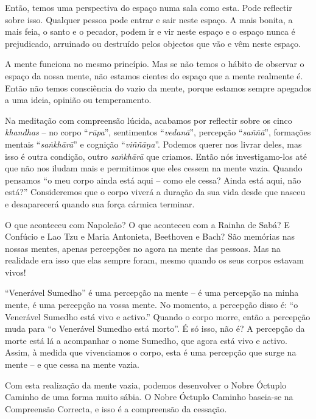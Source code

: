 Então, temos uma perspectiva do espaço numa sala como esta. Pode reflectir sobre
isso. Qualquer pessoa pode entrar e sair neste espaço. A mais bonita, a mais
feia, o santo e o pecador, podem ir e vir neste espaço e o espaço nunca é
prejudicado, arruinado ou destruído pelos objectos que vão e vêm neste espaço.

A mente funciona no mesmo princípio. Mas se não temos o hábito de observar o
espaço da nossa mente, não estamos cientes do espaço que a mente realmente é.
Então não temos consciência do vazio da mente, porque estamos sempre apegados a
uma ideia, opinião ou temperamento.

Na meditação com compreensão lúcida, acabamos por reflectir sobre os cinco
\emph{khandhas} -- no corpo ``\emph{rūpa}'', sentimentos ``\emph{vedanā}'',
percepção ``\emph{saññā}'', formações mentais ``\emph{saṅkhārā}'' e cognição
``\emph{viññāṇa}''. Podemos querer nos livrar deles, mas isso é outra condição,
outro \emph{saṅkhārā} que criamos. Então nós investigamo-los até que não nos
iludam mais e permitimos que eles cessem na mente vazia. Quando pensamos ``o meu
corpo ainda está aqui -- como ele cessa? Ainda está aqui, não está?''
Consideremos que o corpo viverá a duração da sua vida desde que nasceu e
desaparecerá quando sua força cármica terminar.

O que aconteceu com Napoleão? O que aconteceu com a Rainha de Sabá? E Confúcio e
Lao Tzu e Maria Antonieta, Beethoven e Bach? São memórias nas nossas mentes,
apenas percepções no agora na mente das pessoas. Mas na realidade era isso que
elas sempre foram, mesmo quando os seus corpos estavam vivos!

``Venerável Sumedho'' é uma percepção na mente -- é uma percepção na minha
mente, é uma percepção na vossa mente. No momento, a percepção disso é: ``o
Venerável Sumedho está vivo e activo.'' Quando o corpo morre, então a percepção
muda para ``o Venerável Sumedho está morto''. É só isso, não é? A percepção da
morte está lá a acompanhar o nome Sumedho, que agora está vivo e activo. Assim,
à medida que vivenciamos o corpo, esta é uma percepção que surge na mente -- e
que cessa na mente vazia.

Com esta realização da mente vazia, podemos desenvolver o Nobre Óctuplo Caminho
de uma forma muito sábia. O Nobre Óctuplo Caminho baseia-se na Compreensão
Correcta, e isso é a compreensão da cessação.

